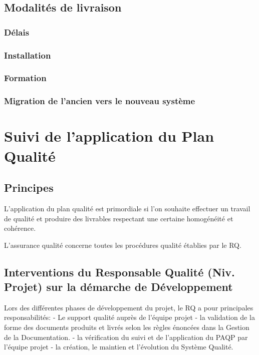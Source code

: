 \documentclass[a4paper]{article}
\begin{document}
\subsection{Modalités de livraison}

\subsubsection{Délais}

\subsubsection{Installation}

\subsubsection{Formation}

\subsubsection{Migration de l'ancien vers le nouveau système}

\section{Suivi de l'application du Plan Qualité}

\subsection{Principes}

L'application du plan qualité est primordiale si l'on souhaite effectuer un travail de qualité et produire des livrables respectant une certaine homogénéité et cohérence.

L'assurance qualité concerne toutes les procédures qualité établies par le RQ.

\subsection{Interventions du Responsable Qualité (Niv. Projet) sur la démarche de Développement}

Lors des différentes phases de développement du projet, le RQ a pour principales responsabilités: - Le support qualité auprès de l'équipe projet - la validation de la forme des documents produits et livrés selon les règles énoncées dans la Gestion de la Documentation. - la vérification du suivi et de l'application du PAQP par l'équipe projet - la création, le maintien et l'évolution du Système Qualité.
\end{document}
